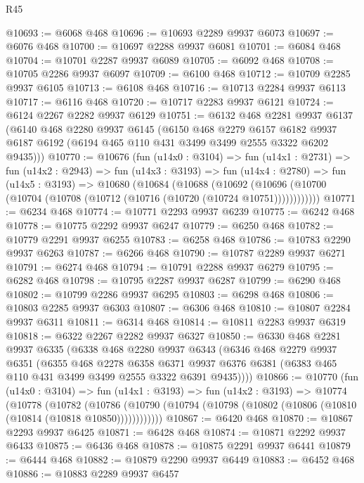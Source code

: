 \begin{lexlean}{R45}
\begin{coremodule}
@10693 := @6068 @468
@10696 := @10693 @2289 @9937 @6073
@10697 := @6076 @468
@10700 := @10697 @2288 @9937 @6081
@10701 := @6084 @468
@10704 := @10701 @2287 @9937 @6089
@10705 := @6092 @468
@10708 := @10705 @2286 @9937 @6097
@10709 := @6100 @468
@10712 := @10709 @2285 @9937 @6105
@10713 := @6108 @468
@10716 := @10713 @2284 @9937 @6113
@10717 := @6116 @468
@10720 := @10717 @2283 @9937 @6121
@10724 := @6124 @2267 @2282 @9937 @6129
@10751 := @6132
    @468
    @2281
    @9937
    @6137
    (@6140
      @468
      @2280
      @9937
      @6145
      (@6150
        @468
        @2279
        @6157
        @6182
        @9937
        @6187
        @6192
        (@6194 @465 @110 @431 @3499 @3499 @2555 @3322 @6202 @9435)))
@10770 := @10676
    (fun (u14x0 : @3104) =>
    fun (u14x1 : @2731) =>
    fun (u14x2 : @2943) =>
    fun (u14x3 : @3193) =>
    fun (u14x4 : @2780) =>
    fun (u14x5 : @3193) =>
    @10680
      (@10684
        (@10688
          (@10692 (@10696 (@10700 (@10704 (@10708 (@10712 (@10716 (@10720 (@10724 @10751))))))))))))
@10771 := @6234 @468
@10774 := @10771 @2293 @9937 @6239
@10775 := @6242 @468
@10778 := @10775 @2292 @9937 @6247
@10779 := @6250 @468
@10782 := @10779 @2291 @9937 @6255
@10783 := @6258 @468
@10786 := @10783 @2290 @9937 @6263
@10787 := @6266 @468
@10790 := @10787 @2289 @9937 @6271
@10791 := @6274 @468
@10794 := @10791 @2288 @9937 @6279
@10795 := @6282 @468
@10798 := @10795 @2287 @9937 @6287
@10799 := @6290 @468
@10802 := @10799 @2286 @9937 @6295
@10803 := @6298 @468
@10806 := @10803 @2285 @9937 @6303
@10807 := @6306 @468
@10810 := @10807 @2284 @9937 @6311
@10811 := @6314 @468
@10814 := @10811 @2283 @9937 @6319
@10818 := @6322 @2267 @2282 @9937 @6327
@10850 := @6330
    @468
    @2281
    @9937
    @6335
    (@6338
      @468
      @2280
      @9937
      @6343
      (@6346
        @468
        @2279
        @9937
        @6351
        (@6355
          @468
          @2278
          @6358
          @6371
          @9937
          @6376
          @6381
          (@6383 @465 @110 @431 @3499 @3499 @2555 @3322 @6391 @9435))))
@10866 := @10770
    (fun (u14x0 : @3104) =>
    fun (u14x1 : @3193) =>
    fun (u14x2 : @3193) =>
    @10774
      (@10778
        (@10782
          (@10786 (@10790 (@10794 (@10798 (@10802 (@10806 (@10810 (@10814 (@10818 @10850))))))))))))
@10867 := @6420 @468
@10870 := @10867 @2293 @9937 @6425
@10871 := @6428 @468
@10874 := @10871 @2292 @9937 @6433
@10875 := @6436 @468
@10878 := @10875 @2291 @9937 @6441
@10879 := @6444 @468
@10882 := @10879 @2290 @9937 @6449
@10883 := @6452 @468
@10886 := @10883 @2289 @9937 @6457

\end{coremodule}
\end{lexlean}
